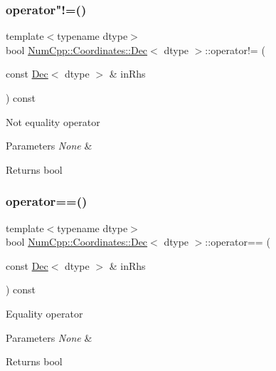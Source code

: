 \subsubsection{\texorpdfstring{operator"!=()}{operator!=()}}
{\footnotesize\ttfamily template$<$typename dtype$>$ \\
bool \mbox{\hyperlink{class_num_cpp_1_1_coordinates_1_1_dec}{Num\+Cpp\+::\+Coordinates\+::\+Dec}}$<$ dtype $>$\+::operator!= (\begin{DoxyParamCaption}\item[{const \mbox{\hyperlink{class_num_cpp_1_1_coordinates_1_1_dec}{Dec}}$<$ dtype $>$ \&}]{in\+Rhs }\end{DoxyParamCaption}) const\hspace{0.3cm}{\ttfamily [inline]}}

Not equality operator


\begin{DoxyParams}{Parameters}
{\em None} & \\
\hline
\end{DoxyParams}
\begin{DoxyReturn}{Returns}
bool 
\end{DoxyReturn}
\mbox{\label{class_num_cpp_1_1_coordinates_1_1_dec_a562f803afeaeb1ab2ebacbbfd048fd17}} 
\subsubsection{\texorpdfstring{operator==()}{operator==()}}
{\footnotesize\ttfamily template$<$typename dtype$>$ \\
bool \mbox{\hyperlink{class_num_cpp_1_1_coordinates_1_1_dec}{Num\+Cpp\+::\+Coordinates\+::\+Dec}}$<$ dtype $>$\+::operator== (\begin{DoxyParamCaption}\item[{const \mbox{\hyperlink{class_num_cpp_1_1_coordinates_1_1_dec}{Dec}}$<$ dtype $>$ \&}]{in\+Rhs }\end{DoxyParamCaption}) const\hspace{0.3cm}{\ttfamily [inline]}}

Equality operator


\begin{DoxyParams}{Parameters}
{\em None} & \\
\hline
\end{DoxyParams}
\begin{DoxyReturn}{Returns}
bool 
\end{DoxyReturn}
\mbox{\label{class_num_cpp_1_1_coordinates_1_1_dec_aa11f1fac2dfe2a9341b25d2ee71a9a34}} 
